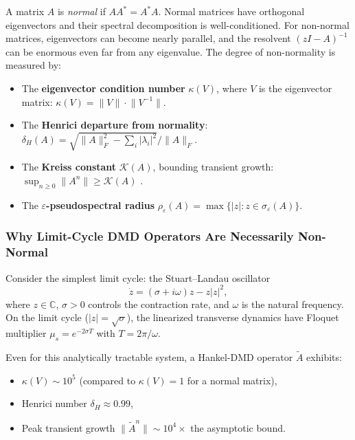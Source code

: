 \documentclass[12pt]{article}
\newcommand{\C}{\mathbb{C}}
\newcommand{\norm}[1]{\lVert #1 \rVert}
\newcommand{\abs}[1]{\lvert #1 \rvert}
\newcommand{\Atilde}{\tilde{A}}
\begin{document}
A matrix $A$ is \emph{normal} if $A A^* = A^* A$. Normal matrices have
orthogonal eigenvectors and their spectral decomposition is well-conditioned.
For non-normal matrices, eigenvectors can become nearly parallel, and the
resolvent $(zI - A)^{-1}$ can be enormous even far from any eigenvalue.
The degree of non-normality is measured by:

\begin{itemize}
  \item The \textbf{eigenvector condition number} $\kappa(V)$, where $V$
  is the eigenvector matrix: $\kappa(V) = \norm{V} \cdot \norm{V^{-1}}$.
  \item The \textbf{Henrici departure from normality}:
  $\delta_H(A) = \sqrt{\norm{A}_F^2 - \sum_i \abs{\lambda_i}^2} / \norm{A}_F$.
  \item The \textbf{Kreiss constant} $\mathcal{K}(A)$, bounding transient
  growth: $\sup_{n \geq 0} \norm{A^n} \geq \mathcal{K}(A)$
  \citep{trefethen2005spectra}.
  \item The \textbf{$\varepsilon$-pseudospectral radius}
  $\rho_\varepsilon(A) = \max\{\abs{z} : z \in \sigma_\varepsilon(A)\}$.
\end{itemize}

\subsubsection{Why Limit-Cycle DMD Operators Are Necessarily Non-Normal}
\label{sec:why_nonnormal}

Consider the simplest limit cycle: the Stuart--Landau oscillator
\begin{equation}
  \dot{z} = (\sigma + i\omega) z - z\abs{z}^2,
  \label{eq:stuart_landau}
\end{equation}
where $z \in \C$, $\sigma > 0$ controls the contraction rate, and
$\omega$ is the natural frequency. On the limit cycle ($\abs{z} = \sqrt{\sigma}$),
the linearized transverse dynamics have Floquet multiplier
$\mu_s = e^{-2\sigma T}$ with $T = 2\pi/\omega$.

Even for this analytically tractable system, a Hankel-DMD operator $\Atilde$
exhibits:
\begin{itemize}
  \item $\kappa(V) \sim 10^5$ (compared to $\kappa(V) = 1$ for a normal matrix),
  \item Henrici number $\delta_H \approx 0.99$,
  \item Peak transient growth $\norm{\Atilde^n} \sim 10^4 \times$ the
  asymptotic bound.
\end{itemize}
\end{document}
